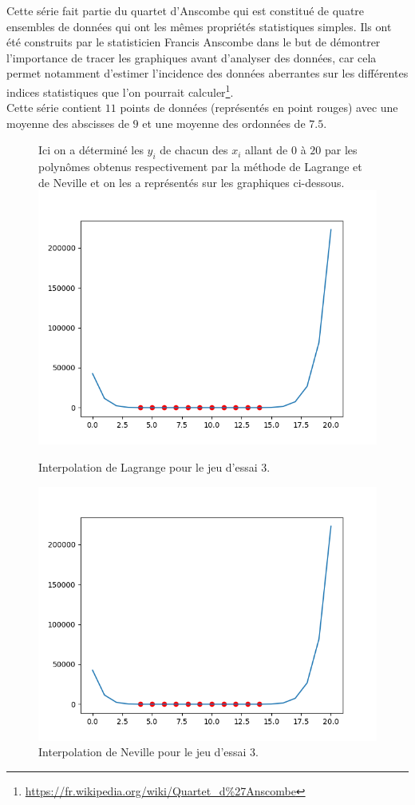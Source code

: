 \documentclass[12pt,french,titlepage]{article}
\begin{document}
	Cette série fait partie du quartet d'Anscombe qui est constitué de quatre ensembles de données qui ont les mêmes propriétés statistiques simples. Ils ont été construits par le statisticien Francis Anscombe dans le but de démontrer l'importance de tracer les graphiques avant d'analyser des données, car cela permet notamment d'estimer l'incidence des données aberrantes sur les différentes indices statistiques que l'on pourrait calculer\footnote{\url{https://fr.wikipedia.org/wiki/Quartet_d\%27Anscombe}}.\\
	Cette série contient $11$ points de données (représentés en point rouges) avec une moyenne des abscisses de $9$ et une moyenne des ordonnées de $7.5$.
		\begin{figure}[H]
		
Ici on a déterminé les $y_i$ de chacun des $x_i$ allant de $0$ à $20$ par les polynômes obtenus respectivement par la méthode de Lagrange et de Neville et on les a représentés sur les graphiques ci-dessous.
		\includegraphics[width=\textwidth]{"31.png"}
		\caption{Interpolation de Lagrange pour le jeu d'essai 3.}
		\end{figure}
		
		\begin{figure}[H]
		\includegraphics[width=\textwidth]{"32.png"}
		\caption{Interpolation de Neville pour le jeu d'essai 3.}
		\end{figure}
		
\end{document}

